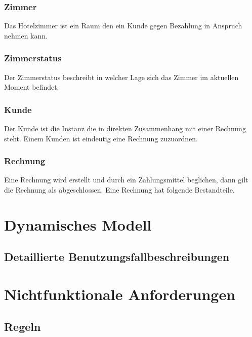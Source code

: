 \documentclass[10pt,a4paper,titlepage]{article}
\begin{document}
\subsubsection{Zimmer}
Das Hotelzimmer ist ein Raum den ein Kunde gegen Bezahlung in Anspruch nehmen kann.
\subsubsection{Zimmerstatus}
Der Zimmerstatus beschreibt in welcher Lage sich das Zimmer im aktuellen Moment befindet.
\subsubsection{Kunde}
Der Kunde ist die Instanz die in direkten Zusammenhang mit einer Rechnung steht.
Einem Kunden ist eindeutig eine Rechnung zuzuordnen.
\subsubsection{Rechnung}
Eine Rechnung wird erstellt und durch ein Zahlungsmittel beglichen, dann gilt die Rechnung als abgeschlossen. Eine Rechnung hat folgende Bestandteile.

\newpage

\section{Dynamisches Modell}
\subsection{Detaillierte Benutzungsfallbeschreibungen}













\newpage

\section{Nichtfunktionale Anforderungen}
\subsection{Regeln}
\end{document}
